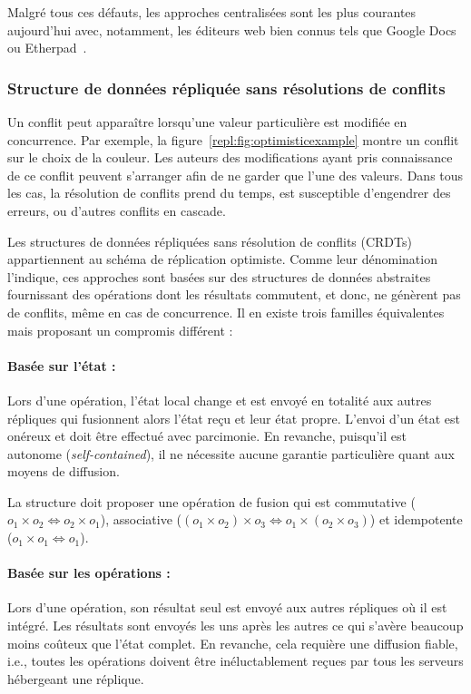 \noindent Malgré tous ces défauts, les approches centralisées sont les plus
courantes aujourd'hui avec, notamment, les éditeurs web bien connus tels que
Google Docs~\cite{googledocs} ou Etherpad~\cite{etherpad}.


\subsubsection{Structure de données répliquée sans résolutions de conflits}
\label{repl:subsubsec:crdts}

Un conflit peut apparaître lorsqu'une valeur particulière est modifiée en
concurrence. Par exemple, la figure~\ref{repl:fig:optimisticexample} montre un
conflit sur le choix de la couleur. Les auteurs des modifications ayant pris
connaissance de ce conflit peuvent s'arranger afin de ne garder que l'une des
valeurs. Dans tous les cas, la résolution de conflits prend du temps, est
susceptible d'engendrer des erreurs, ou d'autres conflits en cascade.

Les structures de données répliquées sans résolution de conflits
(CRDTs)~\cite{shapiro2011comprehensive, shapiro2011conflict} appartiennent au
schéma de réplication optimiste. Comme leur dénomination l'indique, ces
approches sont basées sur des structures de données abstraites fournissant des
opérations dont les résultats commutent, et donc, ne génèrent pas de conflits,
même en cas de concurrence.  Il en existe trois familles équivalentes mais
proposant un compromis différent :

\paragraph{Basée sur l'état :} Lors d'une opération, l'état local change et est
envoyé en totalité aux autres répliques qui fusionnent alors l'état reçu et leur
état propre. L'envoi d'un état est onéreux et doit être effectué avec
parcimonie. En revanche, puisqu'il est autonome (\emph{self-contained}), il ne
nécessite aucune garantie particulière quant aux moyens de diffusion.

\noindent La structure doit proposer une opération de fusion qui est commutative
($o_1 \times o_2 \Leftrightarrow o_2 \times o_1$), associative
($(o_1 \times o_2) \times o_3 \Leftrightarrow o_1 \times (o_2 \times o_3)$) et
idempotente ($o_1 \times o_1 \Leftrightarrow o_1$).

\paragraph{Basée sur les opérations :} Lors d'une opération, son résultat seul
est envoyé aux autres répliques où il est intégré. Les résultats sont envoyés
les uns après les autres ce qui s'avère beaucoup moins coûteux que l'état
complet. En revanche, cela requière une diffusion fiable, i.e., toutes les
opérations doivent être inéluctablement reçues par tous les serveurs hébergeant
une réplique.

